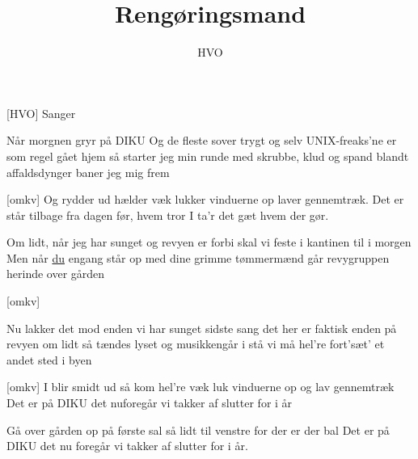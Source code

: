 \documentclass[a4paper,11pt]{article}
\title{Rengøringsmand}
\author{HVO}
\begin{document}
\maketitle

\begin{roles}
[HVO] Sanger

\end{roles}


\begin{song}
%
Når morgnen gryr på DIKU
Og de fleste sover trygt
og selv UNIX-freaks'ne
er som regel gået hjem
så starter jeg min runde
med skrubbe, klud og spand
blandt affaldsdynger
baner jeg mig frem

[omkv]%
Og rydder ud
hælder væk
lukker vinduerne op
laver gennemtræk.
Det er står tilbage
fra dagen før,
hvem tror I ta'r det
gæt hvem der gør.

%
Om lidt, når jeg har sunget
og revyen er forbi
skal vi feste i kantinen
til i morgen
Men når \underline{du} engang står op
med dine grimme tømmermænd
går revygruppen herinde
over gården

[omkv]

%
Nu lakker det mod enden
vi har sunget sidste sang
det her er faktisk
enden på revyen
om lidt så tændes lyset 
og musikkengår i stå 
vi må hel're fort'sæt'
et andet sted i byen

[omkv]%
I blir smidt ud
så kom hel're væk
luk vinduerne op
og lav gennemtræk
Det er på DIKU
det nuforegår
vi takker af
slutter for i år

%
Gå over gården
op på første sal
så lidt til venstre
for der er der bal
Det er på DIKU
det nu foregår
vi takker af
slutter for i år.
\end{song}
\end{document}
